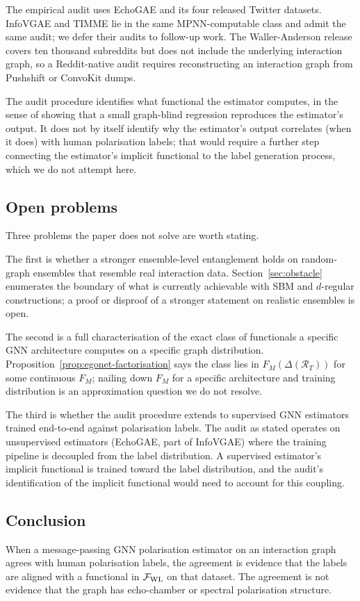 The empirical audit uses EchoGAE and its four released Twitter
datasets. InfoVGAE and TIMME lie in the same MPNN-computable
class and admit the same audit; we defer their audits to follow-up
work. The Waller-Anderson release covers ten thousand subreddits
but does not include the underlying interaction graph, so a
Reddit-native audit requires reconstructing an interaction graph
from Pushshift or ConvoKit dumps.

The audit procedure identifies what functional the estimator
computes, in the sense of showing that a small graph-blind
regression reproduces the estimator's output. It does not by itself
identify why the estimator's output correlates (when it does) with
human polarisation labels; that would require a further step
connecting the estimator's implicit functional to the label
generation process, which we do not attempt here.

\subsection{Open problems}

Three problems the paper does not solve are worth stating.

The first is whether a stronger ensemble-level entanglement holds on
random-graph ensembles that resemble real interaction data.
Section~\ref{sec:obstacle} enumerates the boundary of what is currently
achievable with SBM and $d$-regular constructions; a proof or
disproof of a stronger statement on realistic ensembles is open.

The second is a full characterisation of the exact class of
functionals a specific GNN architecture computes on a specific graph
distribution. Proposition~\ref{prop:egonet-factorisation} says the class lies
in $F_M(\Delta(\mathcal{R}_T))$ for some continuous $F_M$; nailing
down $F_M$ for a specific architecture and training distribution is
an approximation question we do not resolve.

The third is whether the audit procedure extends to supervised
GNN estimators trained end-to-end against polarisation labels. The
audit as stated operates on unsupervised estimators (EchoGAE, part
of InfoVGAE) where the training pipeline is decoupled from the
label distribution. A supervised estimator's implicit functional
is trained toward the label distribution, and the audit's
identification of the implicit functional would need to account for
this coupling.

\subsection{Conclusion}

When a message-passing GNN polarisation estimator on an interaction
graph agrees with human polarisation labels, the agreement is
evidence that the labels are aligned with a functional in
$\mathcal{F}_{\mathrm{WL}}$ on that dataset. The agreement is not evidence
that the graph has echo-chamber or spectral polarisation structure.
